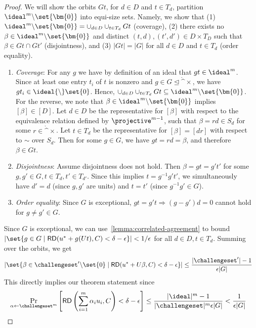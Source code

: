 \begin{proof}
We will show the orbits $Gt$, for $d \in D$ and $t \in T_d$, partition $\ideal^{m}{\setminus}\set{\bm{0}}$ into equi-size sets. Namely, we show that (1) $\ideal^{m}{\setminus}\set{\bm{0}} = \cup_{d \in D} \cup_{t \in T_d} G t$ (coverage), (2) there exists no $\beta \in \ideal^{m}{\setminus}\set{\bm{0}}$ and distinct $(t,d),(t',d') \in D \times T_D$ such that $\beta \in G t \cap G t'$ (disjointness), and (3) $|G t| = |G|$ for all $d \in D$ and $t \in T_d$ (order equality).
\begin{enumerate}[nosep]
    \item \emph{Coverage}: For any $g$ we have by definition of an ideal that $gt \in \ideal^m$. Since at least one entry $t_i$ of $t$ is nonzero and $g \in G \trianglelefteq \ring^\times$, we have $g t_i \in \ideal{\setminus}\set{0}$. Hence, $\cup_{d \in D} \cup_{t \in T_d} G t \subseteq \ideal^{m}{\setminus}\set{\bm{0}}$. For the reverse, we note that $\beta \in \ideal^{m}{\setminus}\set{\bm{0}}$ implies $[\beta] \in [D]$. Let $d \in D$ be the representative for $[\beta]$ with respect to the equivalence relation defined by $\projective^{m-1}$, such that $\beta = rd \in S_d$ for some $r \in \ring^\times$. Let $t \in T_d$ be the representative for $[\beta] = [dr]$ with respect to $\sim$ over $S_d$. Then for some $g \in G$, we have $gt = rd = \beta$, and therefore $\beta \in Gt$.
    \item \emph{Disjointness}: Assume disjointness does not hold. Then $\beta = gt = g't'$ for some $g,g' \in G, t \in T_d, t' \in T_{d'}$. Since this implies $t = g^{-1}g't'$, we simultaneously have $d' = d$ (since $g,g'$ are units) and $t = t'$ (since $g^{-1}g' \in G$).
    \item \emph{Order equality}: Since $G$ is exceptional, $gt = g't \Rightarrow (g-g')d = 0$ cannot hold for $g \neq g' \in G$.
\end{enumerate}
Since $G$ is exceptional, we can use~\cref{lemma:correlated-agreement} to bound $|\set{g \in G \mid \mathsf{RD}(u^\ast + g(Ut),C) < \delta - \epsilon}| < 1/\epsilon$ for all $d \in D, t \in T_d$. Summing over the orbits, we get
\begin{align*}
|\set{\beta \in \challengeset'{\setminus\set{0}} \mid \mathsf{RD}(u^\ast + U\beta,C) < \delta - \epsilon}| &\leq \frac{|\challengeset'| - 1}{\epsilon|G|} \\
\end{align*}
This directly implies our theorem statement since
\begin{align*}
\Pr_{\alpha \gets \challengeset^m} \left[\mathsf{RD}\left(\sum_{i=1}^{m} \alpha_i u_i,C\right) < \delta - \epsilon\right] \leq \frac{|\ideal|^m - 1}{|\challengeset|^m \epsilon |G|} < \frac{1}{\epsilon |G|}
\end{align*}
\end{proof}


